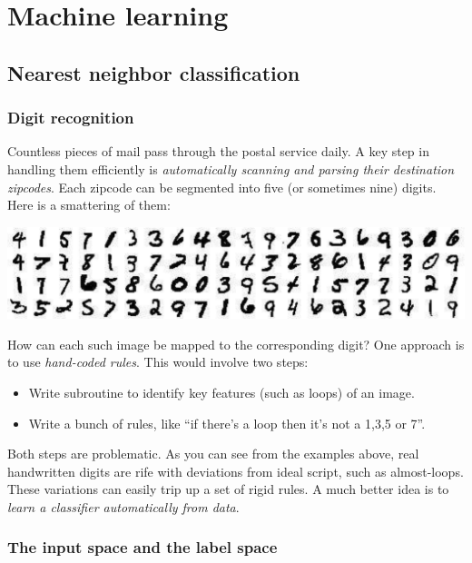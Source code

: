 \chapter{Machine learning}

\section{Nearest neighbor classification}

\subsection{Digit recognition}

Countless pieces of mail pass through the postal service daily. A key step in handling
them efficiently is {\it automatically scanning and parsing their destination zipcodes}.
Each zipcode can be segmented into five (or sometimes nine) digits. Here is a smattering
of them:

\begin{center}
\includegraphics[width=6in]{figs/mnist.pdf}
\end{center}

\noindent
How can each such image be mapped to the corresponding digit? One approach is to
use {\it hand-coded rules}. This would involve two steps:
\begin{itemize}
\item Write subroutine to identify key features (such as loops) of an image.
\item Write a bunch of rules, like ``if there's a loop then it's not a 1,3,5 or 7''.
\end{itemize}
Both steps are problematic. As you can see from the examples above, real handwritten
digits are rife with deviations from ideal script, such as almost-loops. These 
variations can easily trip up a set of rigid rules. A much better idea is to 
{\it learn a classifier automatically from data}.

\subsection{The input space and the label space}

